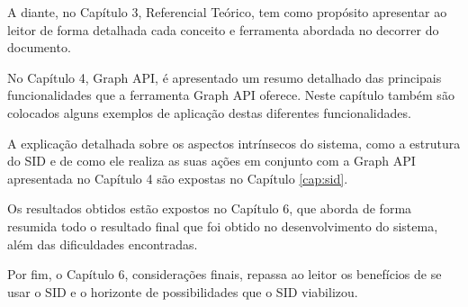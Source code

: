 A diante, no Capítulo 3, Referencial Teórico, tem como propósito apresentar ao leitor de forma detalhada cada conceito e ferramenta abordada no decorrer do documento.

No Capítulo 4, Graph API, é apresentado um resumo detalhado das principais funcionalidades que a ferramenta Graph API oferece. Neste capítulo também são colocados alguns exemplos de aplicação destas diferentes funcionalidades.

A explicação detalhada sobre os aspectos intrínsecos do sistema, como a estrutura do SID e de como ele realiza as suas ações em conjunto com a Graph API apresentada no Capítulo 4 são expostas no Capítulo \ref{cap:sid}.

Os resultados obtidos estão expostos no Capítulo 6, que aborda de forma resumida todo o resultado final que foi obtido no desenvolvimento do sistema, além das dificuldades encontradas.

Por fim, o Capítulo 6, considerações finais, repassa ao leitor os benefícios de se usar o SID e o horizonte de possibilidades que o SID viabilizou.

